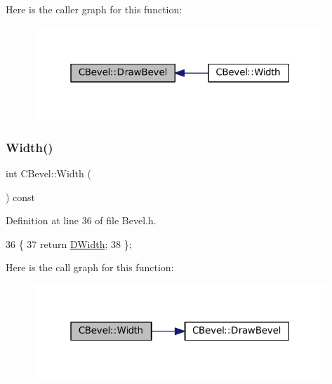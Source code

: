 Here is the caller graph for this function\+:\nopagebreak
\begin{figure}[H]
\begin{center}
\leavevmode
\includegraphics[width=313pt]{classCBevel_a407870821f37aa77621723116e979c4c_icgraph}
\end{center}
\end{figure}
\hypertarget{classCBevel_a40e07306be05c5683ceb9db1aa200f6a}{}\label{classCBevel_a40e07306be05c5683ceb9db1aa200f6a} 
\subsubsection{\texorpdfstring{Width()}{Width()}}
{\footnotesize\ttfamily int C\+Bevel\+::\+Width (\begin{DoxyParamCaption}{ }\end{DoxyParamCaption}) const\hspace{0.3cm}{\ttfamily [inline]}}



Definition at line 36 of file Bevel.\+h.


\begin{DoxyCode}
36                          \{
37             \textcolor{keywordflow}{return} \hyperlink{classCBevel_a891dccc1828c48e5e7a475ca33080060}{DWidth};
38         \};
\end{DoxyCode}
Here is the call graph for this function\+:\nopagebreak
\begin{figure}[H]
\begin{center}
\leavevmode
\includegraphics[width=313pt]{classCBevel_a40e07306be05c5683ceb9db1aa200f6a_cgraph}
\end{center}
\end{figure}


